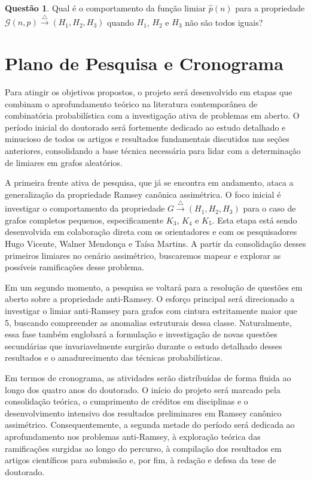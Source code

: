\documentclass[reqno, 12pt]{amsart}
\numberwithin{equation}{section}
\theoremstyle{definition}
\newtheorem{question}{Questão}[section]
\theoremstyle{plain}
\begin{document}
\begin{question}
Qual é o comportamento da função limiar $\widehat{p}(n)$ para a propriedade $\mathcal{G}(n,p) \xrightarrow{\triangle} (H_1, H_2, H_3)$ quando $H_1$, $H_2$ e $H_3$ não são todos iguais?
\end{question}


\section{Plano de Pesquisa e Cronograma}

Para atingir os objetivos propostos, o projeto será desenvolvido em etapas que combinam o aprofundamento teórico na literatura contemporânea de combinatória probabilística com a investigação ativa de problemas em aberto. O período inicial do doutorado será fortemente dedicado ao estudo detalhado e minucioso de todos os artigos e resultados fundamentais discutidos nas seções anteriores, consolidando a base técnica necessária para lidar com a determinação de limiares em grafos aleatórios.

A primeira frente ativa de pesquisa, que já se encontra em andamento, ataca a generalização da propriedade Ramsey canônica assimétrica. O foco inicial é investigar o comportamento da propriedade $G \xrightarrow{\triangle} (H_1, H_2, H_3)$ para o caso de grafos completos pequenos, especificamente $K_3$, $K_4$ e $K_5$. Esta etapa está sendo desenvolvida em colaboração direta com os orientadores e com os pesquisadores Hugo Vicente, Walner Mendonça e Taísa Martins. A partir da consolidação desses primeiros limiares no cenário assimétrico, buscaremos mapear e explorar as possíveis ramificações desse problema.

Em um segundo momento, a pesquisa se voltará para a resolução de questões em aberto sobre a propriedade anti-Ramsey. O esforço principal será direcionado a investigar o limiar anti-Ramsey para grafos com cintura estritamente maior que 5, buscando compreender as anomalias estruturais dessa classe. Naturalmente, essa fase também englobará a formulação e investigação de novas questões secundárias que invariavelmente surgirão durante o estudo detalhado desses resultados e o amadurecimento das técnicas probabilísticas.

Em termos de cronograma, as atividades serão distribuídas de forma fluida ao longo dos quatro anos do doutorado. O início do projeto será marcado pela consolidação teórica, o cumprimento de créditos em disciplinas e o desenvolvimento intensivo dos resultados preliminares em Ramsey canônico assimétrico. Consequentemente, a segunda metade do período será dedicada ao aprofundamento nos problemas anti-Ramsey, à exploração teórica das ramificações surgidas ao longo do percurso, à compilação dos resultados em artigos científicos para submissão e, por fim, à redação e defesa da tese de doutorado.


\printbibliography
\end{document}
